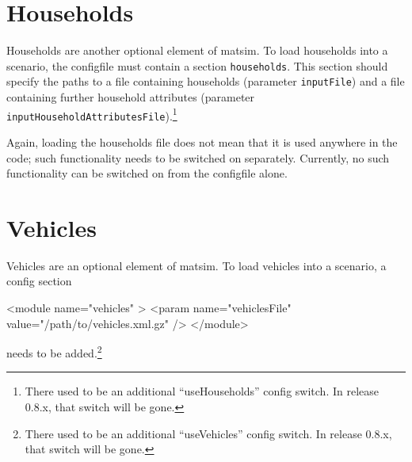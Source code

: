 \section{Households}
\label{sec:extending-households}
Households are another optional element of \gls{matsim}. To load households into a scenario, the %
\gls{configfile} must 
contain a section \lstinline|households|. This section should specify the paths to a file containing households (parameter \lstinline|inputFile|) and a file containing further household attributes (parameter \lstinline|inputHouseholdAttributesFile|).\footnote{%
%
There used to be an additional ``useHouseholds'' config switch.  In release 0.8.x, that switch will be gone.
%
}

Again, loading the households file does not mean that it is used anywhere in the code; such functionality needs to be switched on separately.  Currently, no such functionality can be switched on from the \gls{configfile} alone.



\section{Vehicles}
\label{sec:extending-vehicles}

Vehicles are an optional element of \gls{matsim}. To load vehicles into a scenario, a config section
\begin{xml}
<module name="vehicles" >
   <param name="vehiclesFile" value="/path/to/vehicles.xml.gz" />
</module>
\end{xml}
needs to be added.\footnote{%
%
There used to be an additional ``useVehicles'' config switch.  In release 0.8.x, that switch will be gone.
%
}

